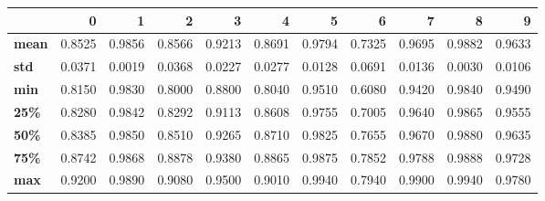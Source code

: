 \begin{tabular}{lrrrrrrrrrr}
\toprule
{} &       0 &       1 &       2 &       3 &       4 &       5 &       6 &       7 &       8 &       9 \\
\midrule
\textbf{mean} &  0.8525 &  0.9856 &  0.8566 &  0.9213 &  0.8691 &  0.9794 &  0.7325 &  0.9695 &  0.9882 &  0.9633 \\
\textbf{std } &  0.0371 &  0.0019 &  0.0368 &  0.0227 &  0.0277 &  0.0128 &  0.0691 &  0.0136 &  0.0030 &  0.0106 \\
\textbf{min } &  0.8150 &  0.9830 &  0.8000 &  0.8800 &  0.8040 &  0.9510 &  0.6080 &  0.9420 &  0.9840 &  0.9490 \\
\textbf{25\% } &  0.8280 &  0.9842 &  0.8292 &  0.9113 &  0.8608 &  0.9755 &  0.7005 &  0.9640 &  0.9865 &  0.9555 \\
\textbf{50\% } &  0.8385 &  0.9850 &  0.8510 &  0.9265 &  0.8710 &  0.9825 &  0.7655 &  0.9670 &  0.9880 &  0.9635 \\
\textbf{75\% } &  0.8742 &  0.9868 &  0.8878 &  0.9380 &  0.8865 &  0.9875 &  0.7852 &  0.9788 &  0.9888 &  0.9728 \\
\textbf{max } &  0.9200 &  0.9890 &  0.9080 &  0.9500 &  0.9010 &  0.9940 &  0.7940 &  0.9900 &  0.9940 &  0.9780 \\
\bottomrule
\end{tabular}
